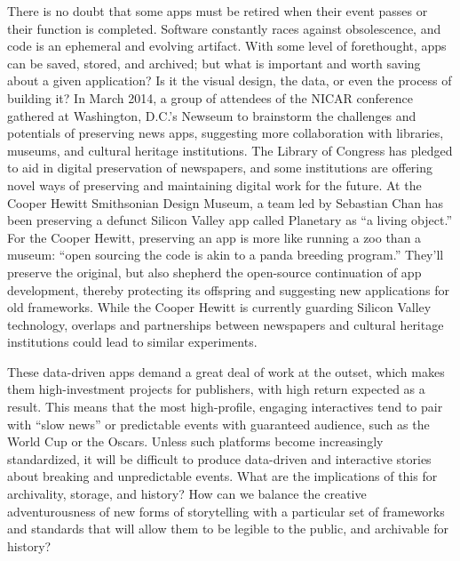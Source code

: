 There is no doubt that some apps must be retired when their event passes or their function is completed. Software constantly races against obsolescence, and code is an ephemeral and evolving artifact. With some level of forethought, apps can be saved, stored, and archived; but what is important and worth saving about a given application? Is it the visual design, the data, or even the process of building it? In March 2014, a group of attendees of the NICAR conference gathered at Washington, D.C.'s Newseum to brainstorm the challenges and potentials of preserving news apps, suggesting more collaboration with libraries, museums, and cultural heritage institutions.\autocite{_opennews/hackdays/archive_????} The Library of Congress has pledged to aid in digital preservation of newspapers, and some institutions are offering novel ways of preserving and maintaining digital work for the future. At the Cooper Hewitt Smithsonian Design Museum, a team led by Sebastian Chan has been preserving a defunct Silicon Valley app called Planetary as ``a living object.'' For the Cooper Hewitt, preserving an app is more like running a zoo than a museum: ``open sourcing the code is akin to a panda breeding program.''\autocite{chan_planetary:_2013} They'll preserve the original, but also shepherd the open-source continuation of app development, thereby protecting its offspring and suggesting new applications for old frameworks. While the Cooper Hewitt is currently guarding Silicon Valley technology, overlaps and partnerships between newspapers and cultural heritage institutions could lead to similar experiments.

These data-driven apps demand a great deal of work at the outset, which makes them high-investment projects for publishers, with high return expected as a result. This means that the most high-profile, engaging interactives tend to pair with ``slow news'' or predictable events with guaranteed audience, such as the World Cup or the Oscars. Unless such platforms become increasingly standardized, it will be difficult to produce data-driven and interactive stories about breaking and unpredictable events. What are the implications of this for archivality, storage, and history? How can we balance the creative adventurousness of new forms of storytelling with a particular set of frameworks and standards that will allow them to be legible to the public, and archivable for history?

